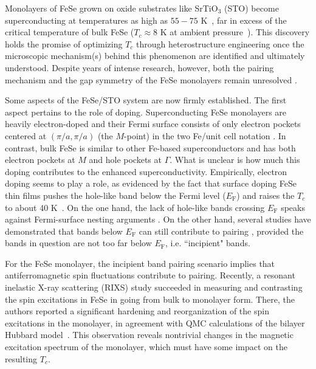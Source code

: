 \documentclass[%
 reprint,
 superscriptaddress,
nofootinbib,
nobibnotes,
 amsmath,amssymb,
 aps,
 prb,
 dvipsnames, 
 floatfix
]{revtex4-2}
\begin{document}
Monolayers of FeSe grown on oxide substrates like SrTiO$_3$ (STO) become superconducting at temperatures as high as $55-75$ K~\cite{Liu:2012di,He:2013cna,Wang:2012jx}, far in excess of the critical temperature of bulk FeSe ($T_c\approx 8$ K at ambient pressure~\cite{Hsu14262}). This discovery holds the promise of optimizing $T_c$ through heterostructure engineering \cite{LeeReview, CohHeterostructure, PhysRevLett.119.107003} once the microscopic mechanism(s) behind this phenomenon are identified and ultimately understood. Despite years of intense research, however, both the pairing mechanism and the gap symmetry of the FeSe monolayers remain unresolved \cite{Kreisel:2020ec}. 

Some aspects of the FeSe/STO system are now firmly established. The first aspect pertains to the role of doping. Superconducting FeSe monolayers are heavily electron-doped and their Fermi surface consists of only electron pockets centered at $(\pi/a,\pi/a)$ (the $M$-point) in the two Fe/unit cell notation \cite{He:2013cna}. In contrast, bulk FeSe is similar to other Fe-based superconductors \cite{Richard_2011, VANROEKEGHEM2016140} and has both electron pockets at $M$ and hole pockets at $\Gamma$. What is unclear is how much this doping contributes to the enhanced superconductivity. Empirically, electron doping seems to play a role, as evidenced by the fact that surface doping FeSe thin films pushes the hole-like band below the Fermi level ($E_\mathrm{F}$) and raises the $T_c$ to about 40 K~\cite{Miyata:2015kb}. On the one hand, the lack of hole-like bands crossing $E_\mathrm{F}$ speaks against Fermi-surface nesting arguments \cite{Mazin2008}. On the other hand, several studies have demonstrated that bands below $E_\mathrm{F}$ can still contribute to pairing \cite{Bang2014, Chen2015, Linscheid2016, Mishra2016}, provided the bands in question are not too far below $E_\mathrm{F}$, i.e. ``incipient" bands. 

For the FeSe monolayer, the incipient band pairing scenario implies that antiferromagnetic spin fluctuations contribute to pairing. Recently, a resonant inelastic X-ray scattering (RIXS) \cite{Pelliciari:2020tu} study succeeded in measuring and contrasting the spin excitations in FeSe in going from bulk to monolayer form. There, the authors reported a significant hardening and reorganization of the spin excitations in the monolayer, in agreement with QMC calculations \cite{Pelliciari:2020tu} of the bilayer Hubbard model~\cite{Maier:2011gp}. This observation reveals nontrivial changes in the magnetic excitation spectrum of the monolayer, which must have some impact on the resulting $T_c$. 
\end{document}
